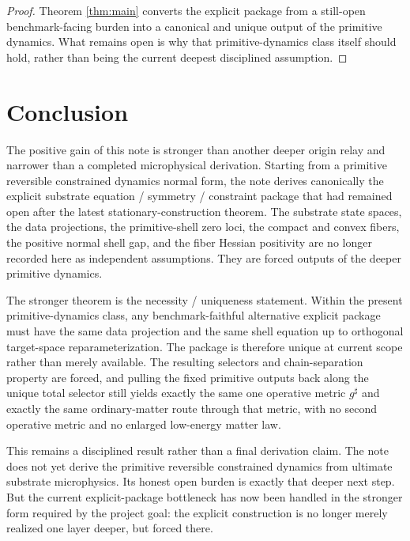 \documentclass[11pt]{article}
\newcommand{\CompletedMetric}{g^{\sharp}}
\begin{document}
\begin{proof}
Theorem \ref{thm:main} converts the explicit package from a still-open benchmark-facing burden into a canonical and unique output of the primitive dynamics. What remains open is why that primitive-dynamics class itself should hold, rather than being the current deepest disciplined assumption.
\end{proof}

\section{Conclusion}

The positive gain of this note is stronger than another deeper origin relay and narrower than a completed microphysical derivation. Starting from a primitive reversible constrained dynamics normal form, the note derives canonically the explicit substrate equation / symmetry / constraint package that had remained open after the latest stationary-construction theorem. The substrate state spaces, the data projections, the primitive-shell zero loci, the compact and convex fibers, the positive normal shell gap, and the fiber Hessian positivity are no longer recorded here as independent assumptions. They are forced outputs of the deeper primitive dynamics.

The stronger theorem is the necessity / uniqueness statement. Within the present primitive-dynamics class, any benchmark-faithful alternative explicit package must have the same data projection and the same shell equation up to orthogonal target-space reparameterization. The package is therefore unique at current scope rather than merely available. The resulting selectors and chain-separation property are forced, and pulling the fixed primitive outputs back along the unique total selector still yields exactly the same one operative metric \(\CompletedMetric\) and exactly the same ordinary-matter route through that metric, with no second operative metric and no enlarged low-energy matter law.

This remains a disciplined result rather than a final derivation claim. The note does not yet derive the primitive reversible constrained dynamics from ultimate substrate microphysics. Its honest open burden is exactly that deeper next step. But the current explicit-package bottleneck has now been handled in the stronger form required by the project goal: the explicit construction is no longer merely realized one layer deeper, but forced there.
\end{document}
